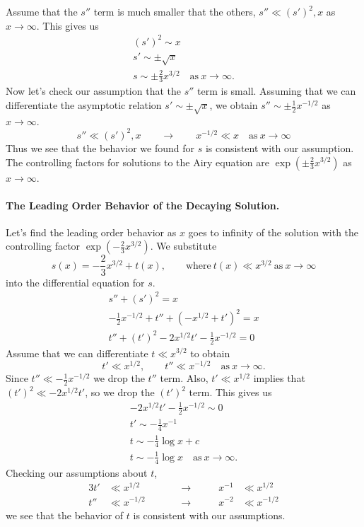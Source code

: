 \begin{Example}
  Assume that the $s''$ term is much smaller that the others, 
  $s'' \ll (s')^2, x$ as $x \to \infty$.  This gives us
  \begin{gather*}
    (s')^2 \sim x  \\
    s' \sim \pm \sqrt{x} \\
    s \sim \pm \frac{2}{3} x^{3/2} \quad \mathrm{as}\ x \to \infty.
  \end{gather*}
  Now let's check our assumption that the $s''$ term is small.  Assuming that we can 
  differentiate the asymptotic relation $s' \sim \pm \sqrt{x}$, we obtain 
  $s'' \sim \pm \frac{1}{2} x^{-1/2}$ as $x \to \infty$.
  \[ s'' \ll (s')^2, x \qquad \to \qquad x^{-1/2} \ll x \quad \mathrm{as}\ x \to \infty \]
  Thus we see that the behavior we found for $s$ is consistent with our assumption.
  The controlling factors for solutions to the Airy equation are $\exp(\pm \frac{2}{3}
  x^{3/2})$ as $x \to \infty$.

  \paragraph{The Leading Order Behavior of the Decaying Solution.}
  Let's find the leading order behavior as $x$ goes to infinity of the solution with the
  controlling factor $\exp(-\frac{2}{3} x^{3/2})$.  We substitute
  \[ s(x) = -\frac{2}{3} x^{3/2} + t(x), \qquad \mathrm{where}\ t(x) \ll x^{3/2}\ \mathrm{as}\ 
  x \to \infty \]
  into the differential equation for $s$.
  \begin{gather*}
    s'' + (s')^2 = x \\
    -\frac{1}{2} x^{-1/2} + t'' + (-x^{1/2} + t')^2 = x \\
    t'' + (t')^2 - 2 x^{1/2} t' - \frac{1}{2} x^{-1/2} = 0
  \end{gather*}
  Assume that we can differentiate $t \ll x^{3/2}$ to obtain
  \[ t' \ll x^{1/2}, \qquad t'' \ll x^{-1/2} \quad \mathrm{as}\ x \to \infty. \]
  Since $t'' \ll -\frac{1}{2} x^{-1/2}$ we drop the $t''$ term.  Also, 
  $t' \ll x^{1/2}$ implies that $(t')^2 \ll -2 x^{1/2} t'$, so we drop the
  $(t')^2$ term.  This gives us
  \begin{gather*}
    -2 x^{1/2} t' - \frac{1}{2} x^{-1/2} \sim 0 \\
    t' \sim -\frac{1}{4} x^{-1} \\
    t \sim -\frac{1}{4} \log x + c \\
    t \sim -\frac{1}{4} \log x \quad \mathrm{as}\ x \to \infty.
  \end{gather*}
  Checking our assumptions about $t$,
  \begin{alignat*}{3}
    t' &\ll x^{1/2} &\qquad &\to &\qquad x^{-1} &\ll x^{1/2} \\
    t'' &\ll x^{-1/2} &\qquad &\to &\qquad x^{-2} &\ll x^{-1/2}
  \end{alignat*}
  we see that the behavior of $t$ is consistent with our assumptions.


\end{Example}
